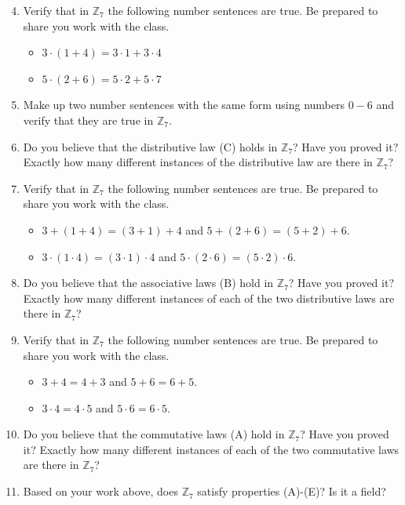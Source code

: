 \documentclass[11pt]{article}
\newenvironment{task}
	{\begin{mdframed}[linecolor=lightgray, linewidth=3pt]\raggedright}
	{\end{mdframed}}
\theoremstyle{definition}
\begin{document}
\begin{task}
    \begin{enumerate}
        \setcounter{enumi}{3}
      \item Verify that in $\mathbb{Z}_7$ the following number sentences are true. Be prepared to share you work with the class.
        \begin{itemize}
          \item $3\cdot (1+4) = 3\cdot 1 + 3 \cdot 4$
          \item $5\cdot (2 + 6) = 5\cdot 2 + 5 \cdot 7$
        \end{itemize}
      \item Make up two number sentences with the same form using numbers $0-6$ and verify that they are true in $\mathbb{Z}_7$.
      \item Do you believe that the distributive law (C) holds in $\mathbb{Z}_7$? Have you proved it? Exactly how many different 
        instances of the distributive law are there in $\mathbb{Z}_7$?
      \item Verify that in $\mathbb{Z}_7$ the following number sentences are true. Be prepared to share you work with the class.
        \begin{itemize}
          \item $3 + (1+4) = (3+1)+4$ and $5 + (2 + 6) = (5 + 2) + 6$.
          \item $3 \cdot (1\cdot 4) = (3\cdot 1)\cdot 4$ and $5 \cdot (2 \cdot 6) = (5 \cdot 2) \cdot 6$.
        \end{itemize}
      \item Do you believe that the associative laws (B) hold in $\mathbb{Z}_7$? Have you proved it? Exactly how many different 
        instances of each of the two distributive laws are there in $\mathbb{Z}_7$?
      \item Verify that in $\mathbb{Z}_7$ the following number sentences are true. Be prepared to share you work with the class.
        \begin{itemize}
          \item $3 +4 = 4+3$ and $5 + 6 = 6+ 5$.
          \item $3 \cdot 4 = 4\cdot 5$ and $5 \cdot 6 = 6 \cdot 5$.
        \end{itemize}
      \item Do you believe that the commutative laws (A) hold in $\mathbb{Z}_7$? Have you proved it? Exactly how many different 
        instances of each of the two commutative laws are there in $\mathbb{Z}_7$?
      \item Based on your work above, does $\mathbb{Z}_7$ satisfy properties (A)-(E)? Is it a field?

\end{enumerate}
\end{task}
\end{document}
